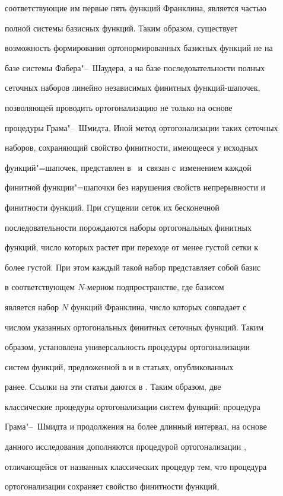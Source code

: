 соответствующие им первые пять функций Франклина, является частью

полной системы базисных функций. Таким образом, существует

возможность формирования ортонормированных базисных функций не на

базе системы Фабера"--~Шаудера, а на базе последовательности полных

сеточных наборов линейно независимых финитных функций-шапочек,

позволяющей проводить ортогонализацию не только на основе

процедуры Грама"--~Шмидта. Иной метод ортогонализации таких сеточных

наборов, сохраняющий свойство финитности, имеющееся у исходных

функций"=шапочек, представлен в~\cite{leontiev:13} и~связан с~изменением каждой

финитной функции"=шапочки без нарушения свойств непрерывности и

финитности функций. При сгущении сеток их бесконечной

последовательности порождаются наборы ортогональных финитных

функций, число которых растет при переходе от менее густой сетки к

более густой. При этом каждый такой набор представляет собой базис

в соответствующем $N$-мерном подпространстве, где базисом

является набор $N$ функций Франклина, число которых совпадает с

числом указанных ортогональных финитных сеточных функций. Таким

образом, установлена универсальность процедуры ортогонализации

систем функций, предложенной в \cite{leontiev:13} и в статьях, опубликованных

ранее. Ссылки на эти статьи даются в \cite{leontiev:13}. Таким образом, две

классические процедуры ортогонализации систем функций: процедура

Грама"--~Шмидта и продолжения на более длинный интервал, на основе

данного исследования дополняются процедурой ортогонализации \cite{leontiev:13},

отличающейся от названных классических процедур тем, что процедура

ортогонализации \cite{leontiev:13} сохраняет свойство финитности функций,

